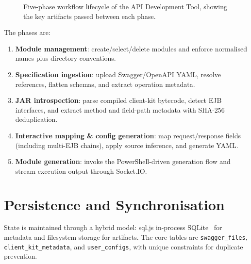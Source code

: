 \begin{figure}[H]
\caption{Five-phase workflow lifecycle of the API Development Tool, showing the key artifacts passed between each phase.}
\label{fig:workflow_lifecycle}
\end{figure}

The phases are:
\begin{enumerate}
    \item \textbf{Module management}: create/select/delete modules and enforce normalised names plus directory conventions.
    \item \textbf{Specification ingestion}: upload Swagger/OpenAPI YAML, resolve references, flatten schemas, and extract operation metadata.
    \item \textbf{JAR introspection}: parse compiled client-kit bytecode, detect EJB interfaces, and extract method and field-path metadata with SHA-256 deduplication.
    \item \textbf{Interactive mapping \& config generation}: map request/response fields (including multi-EJB chains), apply source inference, and generate YAML.
    \item \textbf{Module generation}: invoke the PowerShell-driven generation flow and stream execution output through Socket.IO.
\end{enumerate}

\section{Persistence and Synchronisation}

State is maintained through a hybrid model: sql.js in-process SQLite~\cite{sqljs_docs} for metadata and filesystem storage for artifacts. The core tables are \texttt{swagger\_files}, \texttt{client\_kit\_metadata}, and \texttt{user\_configs}, with unique constraints for duplicate prevention.

